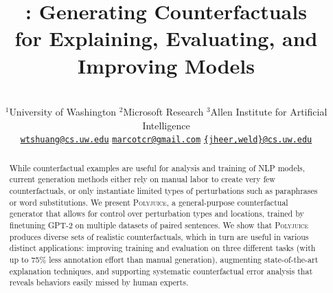 \documentclass[11pt,a4paper]{article}
\title{\sysname: Generating Counterfactuals \\for Explaining, Evaluating, and Improving Models}
\author{
\makecell{
Tongshuang Wu$^{1}$ ~~~~~~~ 
Marco Tulio Ribeiro$^{2}$ ~~~~~~~ 
Jeffrey Heer$^{1}$ ~~~~~ 
Daniel S. Weld$^{1,3}$}  \\ 
$^{1}$University of Washington\hspace{5mm}
$^{2}$Microsoft Research\hspace{5mm} 
$^{3}$Allen Institute for Artificial Intelligence\hspace{5mm}\\
\hspace{-5mm}
\href{mailto:wtshuang@cs.uw.edu}{\texttt {wtshuang@cs.uw.edu}}
\hspace{5mm}
\href{mailto:marcotcr@microsoft.com}{\texttt {marcotcr@gmail.com}}
\hspace{10mm}
\href{mailto:dan@cs.washington.edu}{\texttt {\{jheer,weld\}@cs.uw.edu}}
}
\date{}
\newcommand{\sysname}{\textsc{Polyjuice}\xspace}
\newcommand{\eg}{\emph{e.g.,}\xspace}%
\newcommand{\ensuretext}[1]{#1}
\newcommand{\marker}[2]{\ensuremath{^{\textsc{#1}}_{\textsc{#2}}}}
\newcommand{\arkcomment}[3]{\ensuretext{\textcolor{#3}{[#1 #2]}}}
\newcommand{\dq}[1]{\arkcomment{\marker{D}{Q}}{#1}{cyan}}
\begin{document}
\maketitle
\begin{abstract}


While counterfactual examples
are useful for analysis and training of NLP models, current generation methods either rely on manual labor to create very few counterfactuals, or 
only instantiate limited types of perturbations such as paraphrases or word substitutions. %
We present \sysname, a general-purpose counterfactual generator that allows for control over perturbation types and locations, trained by finetuning GPT-2 on multiple datasets of paired sentences. 
We show that \sysname produces diverse sets of realistic counterfactuals, which in turn are useful in various distinct applications: improving training and evaluation on three different tasks (with up to 75\% less annotation effort than manual generation), augmenting state-of-the-art explanation techniques, and supporting systematic counterfactual error analysis that reveals behaviors easily missed by human experts.




\end{abstract}
\end{document}
